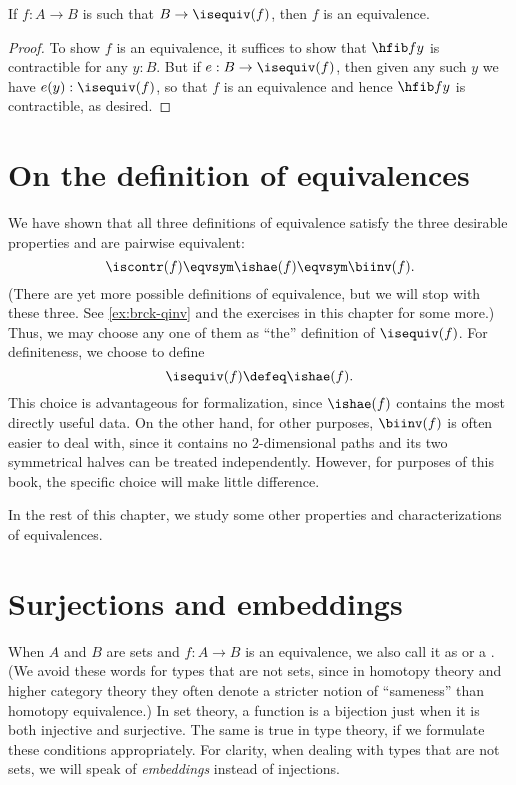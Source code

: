 \begin{cor}\label{thm:equiv-inhabcod}
  If $f:A\to B$ is such that $B\to \isequiv(f)$, then $f$ is an equivalence.
\end{cor}
\begin{proof}
  To show $f$ is an equivalence, it suffices to show that $\hfib f y$ is contractible for any $y:B$.
  But if $e:B\to \isequiv(f)$, then given any such $y$ we have $e(y):\isequiv(f)$, so that $f$ is an equivalence and hence $\hfib f y$ is contractible, as desired.
\end{proof}

%
%
%

\section{On the definition of equivalences}
\label{sec:concluding-remarks}

We have shown that all three definitions of equivalence satisfy the three desirable properties and are pairwise equivalent:
\[ \iscontr(f) \eqvsym \ishae(f) \eqvsym \biinv(f). \]
(There are yet more possible definitions of equivalence, but we will stop with these three.
See \cref{ex:brck-qinv} and the exercises in this chapter for some more.)
Thus, we may choose any one of them as ``the'' definition of $\isequiv (f)$.
For definiteness, we choose to define
\[ \isequiv(f) \defeq \ishae(f).\]
%
This choice is advantageous for formalization, since $\ishae(f)$ contains the most directly useful data.
On the other hand, for other purposes, $\biinv(f)$ is often easier to deal with, since it contains no 2-dimensional paths and its two symmetrical halves can be treated independently.
However, for purposes of this book, the specific choice will make little difference.

In the rest of this chapter, we study some other properties and characterizations of equivalences.
%


\section{Surjections and embeddings}
\label{sec:mono-surj}

When $A$ and $B$ are sets and $f:A\to B$ is an equivalence, we also call it as 
%
or a .
%
%
(We avoid these words for types that are not sets, since in homotopy theory and higher category theory they often denote a stricter notion of ``sameness'' than homotopy equivalence.)
In set theory, a function is a bijection just when it is both injective and surjective.
The same is true in type theory, if we formulate these conditions appropriately.
For clarity, when dealing with types that are not sets, we will speak of \emph{embeddings} instead of injections.

